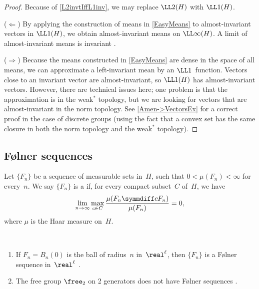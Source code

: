 \begin{proof}
Because of \cref{L2invtIffL1inv}, we may replace $\LL2(H)$ with $\LL1(H)$.

($\Leftarrow$) By applying the construction of means in \cref{EasyMeans} to almost-invariant vectors in $\LL1(H)$, we obtain almost-invariant means on $\LL\infty(H)$. A limit of almost-invariant means is invariant .

($\Rightarrow$) Because the means constructed in \cref{EasyMeans} are dense in the space of all means, we can approximate a left-invariant mean by an $\LL1$~function. Vectors close to an invariant vector are almost-invariant, so $\LL1(H)$ has almost-invariant vectors. However, there are technical issues here; one problem is that the approximation is in the weak$^*$ topology, but we are looking for vectors that are almost-invariant in the norm topology. See \cref{Amen->VectorsEx} for a correct proof in the case of discrete groups (using the fact that a convex set has the same closure in both the norm topology and the weak$^*$ topology).
\end{proof}

 
 
 
 
 \subsection{F\o lner sequences}
 
 \begin{defn}
 Let  $\{F_n\}$ be a sequence of measurable sets in~$H$, such that $0 < \mu(F_n) < \infty$ for every~$n$. We say $\{F_n\}$ is a  if, for every compact subset~$C$ of~$H$, we have 
 	\begin{equation} \label{FolnerLim}
	 \lim_{n \to \infty} \max_{c \in C} \frac{ \mu( F_n \symmdiff c F_n) }{ \mu(F_n) } = 0 ,
	 \end{equation}
where $\mu$ is the Haar measure on~$H$.
\end{defn}

\begin{eg} \label{FolnerEg} \ 
	\begin{enumerate}
	\item  \label{FolnerEg-Rl}
	If $F_n = B_n(0)$ is the ball of radius~$n$ in~$\real^\ell$, then $\{F_n\}$ is a F\o lner sequence in~$\real^\ell$ .
	\item The free group $\free_2$ on 2 generators does not have F\o lner sequences \csee{FreeNoFolnerEx}.
	\end{enumerate}
\end{eg}


